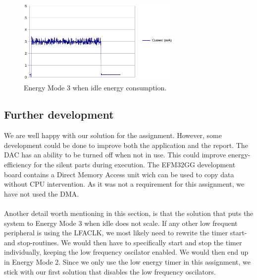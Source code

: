 \begin{figure}[hf]
	\centering
	\includegraphics[width=8cm]{img/em3_sleep.png}
	\caption{Energy Mode 3 when idle energy consumption.}
	\label{fig:em3_sleep}
\end{figure}

\subsection{Further development}
We are well happy with our solution for the assignment. However, some development could be done to improve both the application and the report. The DAC has an ability to be turned off when not in use. This could improve energy-efficiency for the silent parts during execution. The EFM32GG development board contains a Direct Memory Access unit wich can be used to copy data without CPU intervention. As it was not a requirement for this assignment, we have not used the DMA. \\
\\
Another detail worth mentioning in this section, is that the solution that puts the system to Energy Mode 3 when idle does not scale. If any other low frequent peripheral is using the LFACLK, we most likely need to rewrite the timer start- and stop-routines. We would then have to specifically start and stop the timer individually, keeping the low frequency oscilator enabled. We would then end up in Energy Mode 2. Since we only use the low energy timer in this assignment, we stick with our first solution that disables the low frequency oscilators. 
